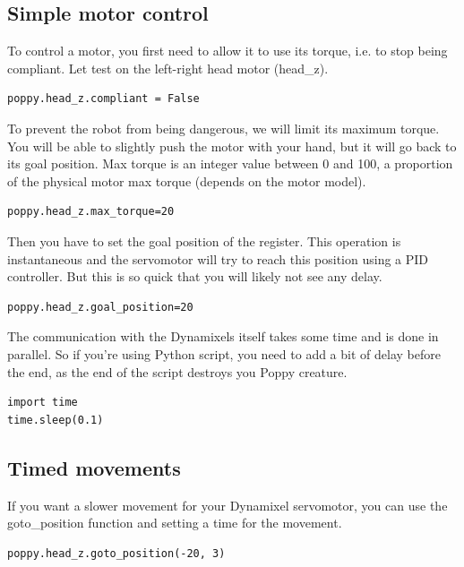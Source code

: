 \documentclass{article}
\begin{document}
\subsection{Simple motor control}

To control a motor, you first need to allow it to use its torque, i.e. to stop being compliant. Let test on the left-right head motor (head\_z).

\begin{verbatim}
poppy.head_z.compliant = False
\end{verbatim}

To prevent the robot from being dangerous, we will limit its maximum torque. You will be able to slightly push the motor with your hand, but it will go back to its goal position. Max torque is an integer value between 0 and 100, a proportion of the physical motor max torque (depends on the motor model).

\begin{verbatim}
poppy.head_z.max_torque=20
\end{verbatim}

Then you have to set the goal position of the register. This operation is instantaneous and the servomotor will try to reach this position using a PID controller. But this is so quick that you will likely not see any delay.

\begin{verbatim}
poppy.head_z.goal_position=20
\end{verbatim}

 The communication with the Dynamixels itself takes some time and is done in parallel. So if you're using Python script, you need to add a bit of delay before the end, as the end of the script destroys you Poppy creature.
 
 \begin{verbatim}
import time
time.sleep(0.1)
\end{verbatim}

\subsection{Timed movements}

If you want a slower movement for your Dynamixel servomotor, you can use the goto\_position function and setting a time for the movement. 

\begin{verbatim}
poppy.head_z.goto_position(-20, 3)
\end{verbatim}
\end{document}
